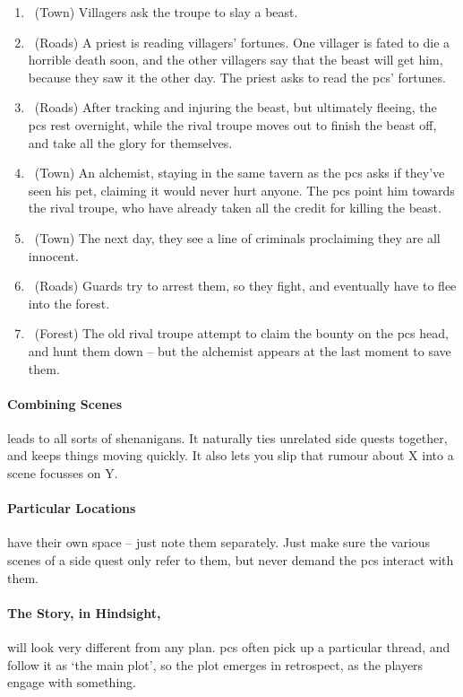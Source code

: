 \begin{multicols}{2}
\begin{enumerate}
  \item
  \sqr~(Town)
  Villagers ask the troupe to slay a beast.
  \item
  \sqr~(Roads)
  A priest is reading villagers' fortunes.
  One villager is fated to die a horrible death soon, and the other villagers say that the beast will get him, because they saw it the other day.
  The priest asks to read the \glspl{pc}' fortunes.
  \item
  \sqr~(Roads)
  After tracking and injuring the beast, but ultimately fleeing, the \glspl{pc} rest overnight, while the rival troupe moves out to finish the beast off, and take all the glory for themselves.
  \item
  \sqr~(Town)
  An alchemist, staying in the same tavern as the \glspl{pc} asks if they've seen his pet, claiming it would never hurt anyone.
  The \glspl{pc} point him towards the rival troupe, who have already taken all the credit for killing the beast.
  \item
  \sqr~(Town)
  The next day, they see a line of criminals proclaiming they are all innocent.
  \item
  \sqr~(Roads)
  Guards try to arrest them, so they fight, and eventually have to flee into the forest.
  \item
  \sqn~(Forest)
  The old rival troupe attempt to claim the bounty on the \glspl{pc} head, and hunt them down -- but the alchemist appears at the last moment to save them.

\end{enumerate}

\paragraph{Combining Scenes}
leads to all sorts of shenanigans.
It naturally ties unrelated side quests together, and keeps things moving quickly.
It also lets you slip that rumour about X into a scene focusses on Y.

\paragraph{Particular Locations}
have their own space -- just note them separately.
Just make sure the various scenes of a side quest only refer to them, but never demand the \glspl{pc} interact with them.

\paragraph{The Story, in Hindsight,}
will look very different from any plan.
\Glspl{pc} often pick up a particular thread, and follow it as `the main plot', so the plot emerges in retrospect, as the players engage with something.


\end{multicols}
